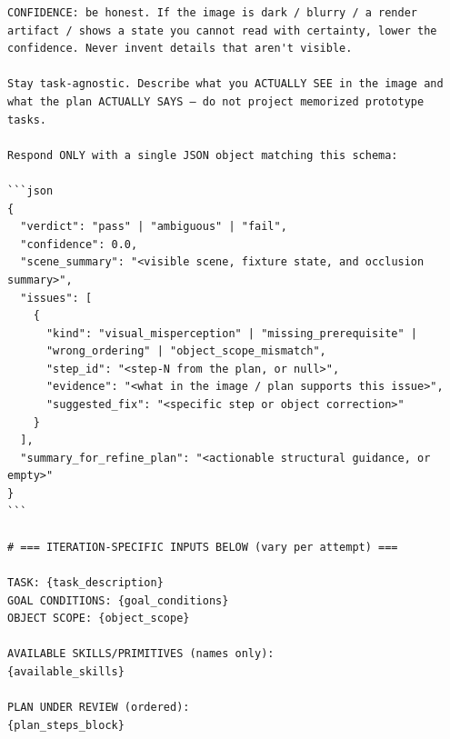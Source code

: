 \begin{lstlisting}[style=ratsappendixprompt]
CONFIDENCE: be honest. If the image is dark / blurry / a render
artifact / shows a state you cannot read with certainty, lower the
confidence. Never invent details that aren't visible.

Stay task-agnostic. Describe what you ACTUALLY SEE in the image and
what the plan ACTUALLY SAYS — do not project memorized prototype tasks.

Respond ONLY with a single JSON object matching this schema:

```json
{
  "verdict": "pass" | "ambiguous" | "fail",
  "confidence": 0.0,
  "scene_summary": "<visible scene, fixture state, and occlusion summary>",
  "issues": [
    {
      "kind": "visual_misperception" | "missing_prerequisite" |
      "wrong_ordering" | "object_scope_mismatch",
      "step_id": "<step-N from the plan, or null>",
      "evidence": "<what in the image / plan supports this issue>",
      "suggested_fix": "<specific step or object correction>"
    }
  ],
  "summary_for_refine_plan": "<actionable structural guidance, or empty>"
}
```

# === ITERATION-SPECIFIC INPUTS BELOW (vary per attempt) ===

TASK: {task_description}
GOAL CONDITIONS: {goal_conditions}
OBJECT SCOPE: {object_scope}

AVAILABLE SKILLS/PRIMITIVES (names only):
{available_skills}

PLAN UNDER REVIEW (ordered):
{plan_steps_block}
\end{lstlisting}

